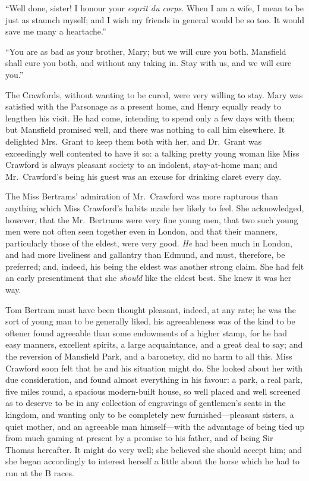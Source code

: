 ``Well done, sister!  I honour your \emph{esprit du corps}.
When I am a wife, I mean to be just as staunch myself;
and I wish my friends in general would be so too.  It would
save me many a heartache.''

``You are as bad as your brother, Mary; but we will cure
you both.  Mansfield shall cure you both, and without
any taking in.  Stay with us, and we will cure you.''

The Crawfords, without wanting to be cured, were very
willing to stay.  Mary was satisfied with the Parsonage
as a present home, and Henry equally ready to lengthen
his visit.  He had come, intending to spend only a few
days with them; but Mansfield promised well, and there
was nothing to call him elsewhere.  It delighted Mrs.\ Grant
to keep them both with her, and Dr.\ Grant was exceedingly
well contented to have it so:  a talking pretty young
woman like Miss Crawford is always pleasant society
to an indolent, stay-at-home man; and Mr.\ Crawford's
being his guest was an excuse for drinking claret every day.

The Miss Bertrams' admiration of Mr.\ Crawford was more
rapturous than anything which Miss Crawford's habits made
her likely to feel.  She acknowledged, however, that the
Mr.\ Bertrams were very fine young men, that two such
young men were not often seen together even in London,
and that their manners, particularly those of the eldest,
were very good.  \emph{He} had been much in London,
and had more liveliness and gallantry than Edmund,
and must, therefore, be preferred; and, indeed, his being
the eldest was another strong claim.  She had felt an early
presentiment that she \emph{should} like the eldest best.
She knew it was her way.

Tom Bertram must have been thought pleasant, indeed, at any rate;
he was the sort of young man to be generally liked,
his agreeableness was of the kind to be oftener found
agreeable than some endowments of a higher stamp, for he
had easy manners, excellent spirits, a large acquaintance,
and a great deal to say; and the reversion of Mansfield Park,
and a baronetcy, did no harm to all this.  Miss Crawford
soon felt that he and his situation might do.  She looked
about her with due consideration, and found almost everything
in his favour:  a park, a real park, five miles round,
a spacious modern-built house, so well placed and well
screened as to deserve to be in any collection of engravings
of gentlemen's seats in the kingdom, and wanting only to be
completely new furnished---pleasant sisters, a quiet mother,
and an agreeable man himself---with the advantage of
being tied up from much gaming at present by a promise
to his father, and of being Sir Thomas hereafter.
It might do very well; she believed she should accept him;
and she began accordingly to interest herself a little
about the horse which he had to run at the B\gdash{} races.


